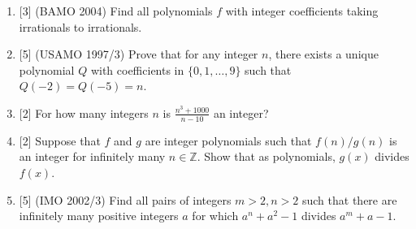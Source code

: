 \begin{enumerate}
\item{}[3] (BAMO 2004) Find all polynomials $f$ with integer coefficients taking irrationals to irrationals. 

\item{}[5] (USAMO 1997/3) Prove that for any integer $n$, there exists a unique polynomial $Q$ with coefficients in $\{0,1,\ldots, 9\}$ such that $Q(-2)=Q(-5)=n$.

\item{}[2] For how many integers $n$ is $\frac{n^3+1000}{n-10}$ an integer?

\item{}[2] Suppose that $f$ and $g$ are integer polynomials such that $f(n)/g(n)$ is an integer for infinitely many $n\in\mathbb Z$. Show that as polynomials, $g(x)$ divides $f(x)$.

\item{}[5] (IMO 2002/3) Find all pairs of integers $m > 2, n > 2$ such that there are infinitely many positive integers $a$ for which $a^n + a^2 - 1$ divides $a^m + a-1$.
\end{enumerate}





